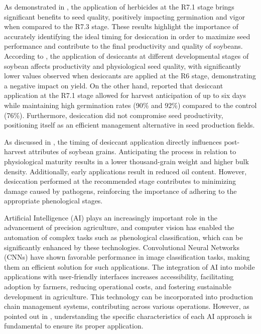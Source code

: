\documentclass[12pt]{article}
\begin{document}
As demonstrated in \cite{castro2022qualidade}, the application of herbicides at the R7.1 stage brings significant benefits to seed quality, positively impacting germination and vigor when compared to the R7.3 stage. These results highlight the importance of accurately identifying the ideal timing for desiccation in order to maximize seed performance and contribute to the final productivity and quality of soybeans. According to \cite{pereira2015dessecacao}, the application of desiccants at different developmental stages of soybean affects productivity and physiological seed quality, with significantly lower values observed when desiccants are applied at the R6 stage, demonstrating a negative impact on yield. On the other hand, \cite{lima2024dessecacao} \cite{cella2014efeito} \cite{inoue2012determinacao} reported that desiccant application at the R7.1 stage allowed for harvest anticipation of up to six days while maintaining high germination rates (90\% and 92\%) compared to the control (76\%). Furthermore, desiccation did not compromise seed productivity, positioning itself as an efficient management alternative in seed production fields. 

As discussed in \cite{botelho2022epocas}, the timing of desiccant application directly influences post-harvest attributes of soybean grains. Anticipating the process in relation to physiological maturity results in a lower thousand-grain weight and higher bulk density. Additionally, early applications result in reduced oil content. However, desiccation performed at the recommended stage contributes to minimizing damage caused by pathogens, reinforcing the importance of adhering to the appropriate phenological stages. 

Artificial Intelligence (AI) plays an increasingly important role in the advancement of precision agriculture, and computer vision has enabled the automation of complex tasks such as phenological classification, which can be significantly enhanced by these technologies. Convolutional Neural Networks (CNNs) have shown favorable performance in image classification tasks, making them an efficient solution for such applications. The integration of AI into mobile applications with user-friendly interfaces increases accessibility, facilitating adoption by farmers, reducing operational costs, and fostering sustainable development in agriculture. This technology can be incorporated into production chain management systems, contributing across various operations. However, as pointed out in \cite{borba2022gestao}, understanding the specific characteristics of each AI approach is fundamental to ensure its proper application. 
\end{document}
